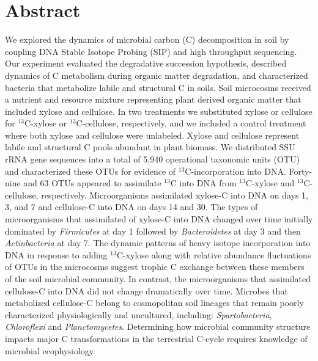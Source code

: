 \section{Abstract} We explored the dynamics of microbial carbon (C)
decomposition in soil by coupling DNA Stable Isotope Probing (SIP) and high
throughput sequencing. Our experiment evaluated the degradative succession
hypothesis, described dynamics of C metabolism during organic matter
degradation, and characterized bacteria that metabolize labile and structural
C in soils. Soil microcosms received a nutrient and resource mixture
representing plant derived organic matter that included xylose and cellulose.
In two treatments we substituted xylose or cellulose for $^{13}$C-xylose or
$^{13}$C-cellulose, respectively, and we included a control treatment where both
xylose and cellulose were unlabeled. Xylose and cellulose represent labile and
structural C pools abundant in plant biomass. We distributed SSU rRNA gene
sequences into a total of 5,940 operational taxonomic units (OTU) and
characterized these OTUs for evidence of $^{13}$C-incorporation into DNA.
Forty-nine and 63 OTUs appeared to assimilate $^{13}$C into DNA from
$^{13}$C-xylose and $^{13}$C-cellulose, respectively. Microorganisms
assimilated xylose-C into DNA on days 1, 3, and 7 and cellulose-C into DNA on
days 14 and 30. The types of microorganisms that assimilated of xylose-C into
DNA changed over time initially dominated by \textit{Firmicutes} at day
1 followed by \textit{Bacteroidetes} at day 3 and then \textit{Actinbacteria}
at day 7. The dynamic patterns of heavy isotope incorporation into DNA in
response to adding $^{13}$C-xylose along with relative abundance fluctuations
of OTUs in the microcosms suggest trophic C exchange between these members of
the soil microbial community. In contrast, the microorganisms that
assimilated cellulose-C into DNA did not change dramatically over time.
Microbes that metabolized cellulose-C belong to cosmopolitan soil lineages
that remain poorly characterized physiologically and uncultured, including:
\textit{Spartobacteria}, \textit{Chloroflexi} and \textit{Planctomycetes}.
Determining how microbial community structure impacts major C transformations
in the terrestrial C-cycle requires knowledge of microbial ecophysiology.
